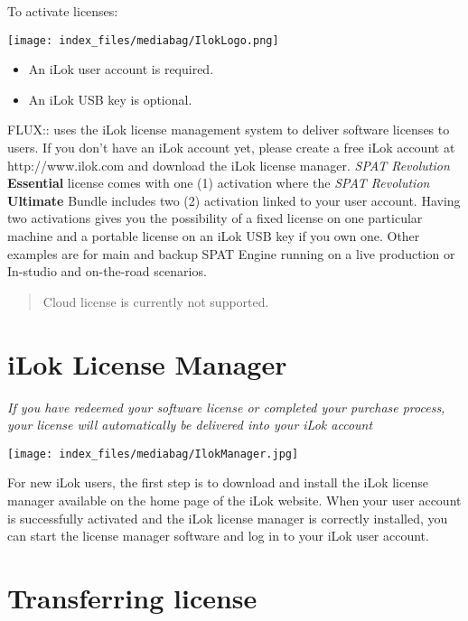 \documentclass[
  letterpaper,
  DIV=11,
  numbers=noendperiod]{scrreport}
\providecommand{\tightlist}{%
  \setlength{\itemsep}{0pt}\setlength{\parskip}{0pt}}\usepackage{longtable,booktabs,array}
\begin{document}
To activate licenses:

\texttt{[image: index\_files/mediabag/IlokLogo.png]}

\begin{itemize}
\tightlist
\item
  An iLok user account is required.
\item
  An iLok USB key is optional.
\end{itemize}

FLUX:: uses the iLok license management system to deliver software
licenses to users. If you don't have an iLok account yet, please create
a free iLok account at http://www.ilok.com and download the iLok license
manager. \emph{SPAT Revolution} \textbf{Essential} license comes with
one (1) activation where the \emph{SPAT Revolution} \textbf{Ultimate}
Bundle includes two (2) activation linked to your user account. Having
two activations gives you the possibility of a fixed license on one
particular machine and a portable license on an iLok USB key if you own
one. Other examples are for main and backup SPAT Engine running on a
live production or In-studio and on-the-road scenarios.

\begin{quote}
Cloud license is currently not supported.
\end{quote}

\hypertarget{ilok-license-manager}{%
\section{iLok License Manager}\label{ilok-license-manager}}

\emph{If you have redeemed your software license or completed your
purchase process, your license will automatically be delivered into your
iLok account}

\texttt{[image: index\_files/mediabag/IlokManager.jpg]}

For new iLok users, the first step is to download and install the iLok
license manager available on the home page of the iLok website. When
your user account is successfully activated and the iLok license manager
is correctly installed, you can start the license manager software and
log in to your iLok user account.

\hypertarget{transferring-license}{%
\section{Transferring license}\label{transferring-license}}
\end{document}
